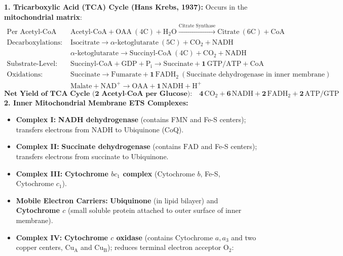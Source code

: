 \documentclass[10pt,a4paper]{article}
\begin{document}
\begin{formulabox}
\textbf{1. Tricarboxylic Acid (TCA) Cycle (Hans Krebs, 1937):}
Occurs in the \textbf{mitochondrial matrix}:
\begin{align*}
  \text{Per Acetyl-CoA (2C): } & \mathrm{Acetyl\text{-}CoA} + \mathrm{OAA}\ (4\mathrm{C}) + \mathrm{H_2O} \xrightarrow{\text{Citrate Synthase}} \text{Citrate}\ (6\mathrm{C}) + \mathrm{CoA}\\
  \text{Decarboxylations: } & \text{Isocitrate} \to \alpha\text{-ketoglutarate}\ (5\mathrm{C}) + \mathrm{CO_2} + \mathrm{NADH}\\
  & \alpha\text{-ketoglutarate} \to \text{Succinyl-CoA}\ (4\mathrm{C}) + \mathrm{CO_2} + \mathrm{NADH}\\
  \text{Substrate-Level: } & \text{Succinyl-CoA} + \mathrm{GDP} + \mathrm{P_i} \to \text{Succinate} + \mathbf{1\,\mathrm{GTP / ATP}} + \mathrm{CoA}\\
  \text{Oxidations: } & \text{Succinate} \to \text{Fumarate} + \mathbf{1\,\mathrm{FADH_2}} \ (\text{Succinate dehydrogenase in inner membrane})\\
  & \text{Malate} + \mathrm{NAD}^+ \to \text{OAA} + \mathbf{1\,\mathrm{NADH} + \mathrm{H}^+}
\end{align*}
\begin{equation}
  \textbf{Net Yield of TCA Cycle (2 Acetyl-CoA per Glucose):} \quad \mathbf{4\,\mathrm{CO_2}} + \mathbf{6\,\mathrm{NADH}} + \mathbf{2\,\mathrm{FADH_2}} + \mathbf{2\,\mathrm{ATP / GTP}}
\end{equation}
\textbf{2. Inner Mitochondrial Membrane ETS Complexes:}
\begin{itemize}
  \item \textbf{Complex I:} \textbf{NADH dehydrogenase} (contains FMN and Fe-S centers); transfers electrons from NADH to Ubiquinone (CoQ).
  \item \textbf{Complex II:} \textbf{Succinate dehydrogenase} (contains $\mathrm{FAD}$ and Fe-S centers); transfers electrons from succinate to Ubiquinone.
  \item \textbf{Complex III:} \textbf{Cytochrome $bc_1$ complex} (Cytochrome $b$, Fe-S, Cytochrome $c_1$).
  \item \textbf{Mobile Electron Carriers:} \textbf{Ubiquinone} (in lipid bilayer) and \textbf{Cytochrome $c$} (small soluble protein attached to outer surface of inner membrane).
  \item \textbf{Complex IV:} \textbf{Cytochrome $c$ oxidase} (contains Cytochrome $a, a_3$ and two copper centers, $\mathrm{Cu_A}$ and $\mathrm{Cu_B}$); reduces terminal electron acceptor $\mathrm{O}_2$:

\end{itemize}
\end{formulabox}
\end{document}
